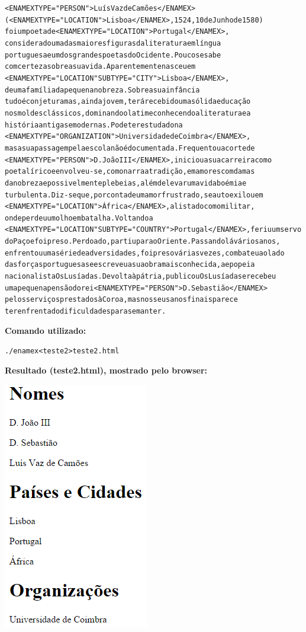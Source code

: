 \documentclass[11pt,a4paper]{article}
\begin{document}
\begin{alltt}
<ENAMEX TYPE="PERSON">Luís Vaz de Camões</ENAMEX> 
(<ENAMEX TYPE="LOCATION">Lisboa</ENAMEX>,1524, 10 de Junho de 1580) 
foi um poeta de <ENAMEX TYPE="LOCATION">Portugal</ENAMEX>, 
considerado uma das maiores figuras da literatura em língua 
portuguesa e um dos grandes poetas do Ocidente. Pouco se sabe 
com certeza sobre a sua vida. Aparentemente nasceu em 
<ENAMEX TYPE="LOCATION" SUBTYPE="CITY">Lisboa</ENAMEX>, 
de uma família da pequena nobreza. Sobre a sua infância 
tudo é conjetura mas, ainda jovem, terá recebido uma sólida educação 
nos moldes clássicos, dominando o latim e conhecendo a literatura e a 
história antigas e modernas. Pode ter estudado na 
<ENAMEX TYPE="ORGANIZATION">Universidade de Coimbra</ENAMEX>,
mas a sua passagem pela escola não é documentada. Frequentou a corte de 
<ENAMEX TYPE="PERSON">D. João III</ENAMEX>, iniciou a sua carreira como 
poeta lírico e envolveu-se, como narra a tradição, em amores com damas 
da nobreza e possivelmente plebeias, além de levar uma vida boémia e  
turbulenta. Diz-se que, por conta de um amor frustrado, se autoexilou em 
<ENAMEX TYPE="LOCATION">África</ENAMEX>,alistado como militar, 
onde perdeu um olho em batalha. Voltando a 
<ENAMEX TYPE="LOCATION" SUBTYPE="COUNTRY">Portugal</ENAMEX>, feriu um servo 
do Paço e foi preso. Perdoado, partiu para o Oriente. Passando lá vários anos, 
enfrentou uma série de adversidades, foi preso várias vezes, combateu ao lado 
das forças portuguesas e escreveu a sua obra mais conhecida, a epopeia 
nacionalista Os Lusíadas. De volta à pátria, publicou Os Lusíadas e recebeu 
uma pequena pensão do rei <ENAMEX TYPE="PERSON">D. Sebastião</ENAMEX>
pelos serviços prestados à Coroa, mas nos seus anos finais parece 
ter enfrentado dificuldades para se manter.
\end{alltt}

\textbf{Comando utilizado:}

\begin{alltt}
./enamex < teste2 > teste2.html
\end{alltt}
\newpage
\textbf{Resultado (teste2.html), mostrado pelo browser:}

\includegraphics[scale=0.84]{html2.png}
\end{document}

